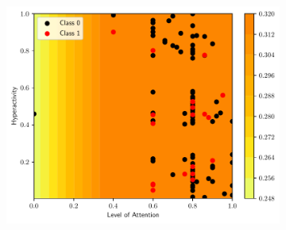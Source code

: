 \documentclass[conference]{IEEEtran}
\theoremstyle{definition}
\theoremstyle{remark}
\theoremstyle{remark}
\begin{document}
\begin{figure}
\begin{subfigure}[b]{0.32\textwidth}
        \centering
        \includegraphics[width=\textwidth]{figs/tree-contour-0-5.pdf}
        \caption{}
    \end{subfigure}


\end{figure}
\end{document}
